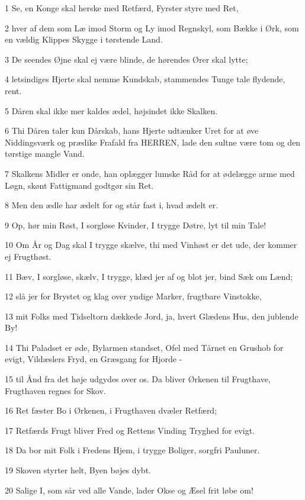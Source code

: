 \par 1 Se, en Konge skal herske med Retfærd, Fyrster styre med Ret,
\par 2 hver af dem som Læ imod Storm og Ly imod Regnskyl, som Bække i Ørk, som en vældig Klippes Skygge i tørstende Land.
\par 3 De seendes Øjne skal ej være blinde, de hørendes Ører skal lytte;
\par 4 letsindiges Hjerte skal nemme Kundskab, stammendes Tunge tale flydende, rent.
\par 5 Dåren skal ikke mer kaldes ædel, højsindet ikke Skalken.
\par 6 Thi Dåren taler kun Dårskab, hans Hjerte udtænker Uret for at øve Niddingsværk og prædike Frafald fra HERREN, lade den sultne være tom og den tørstige mangle Vand.
\par 7 Skalkens Midler er onde, han oplægger lumske Råd for at ødelægge arme med Løgn, skønt Fattigmand godtgør sin Ret.
\par 8 Men den ædle har ædelt for og står fast i, hvad ædelt er.
\par 9 Op, hør min Røst, I sorgløse Kvinder, I trygge Døtre, lyt til min Tale!
\par 10 Om År og Dag skal I trygge skælve, thi med Vinhøst er det ude, der kommer ej Frugthøst.
\par 11 Bæv, I sorgløse, skælv, I trygge, klæd jer af og blot jer, bind Sæk om Lænd;
\par 12 slå jer for Brystet og klag over yndige Marker, frugtbare Vinstokke,
\par 13 mit Folks med Tidseltorn dækkede Jord, ja, hvert Glædens Hus, den jublende By!
\par 14 Thi Paladset er øde, Bylarmen standset, Ofel med Tårnet en Grushob for evigt, Vildæslers Fryd, en Græsgang for Hjorde -
\par 15 til Ånd fra det høje udgydes over os. Da bliver Ørkenen til Frugthave, Frugthaven regnes for Skov.
\par 16 Ret fæster Bo i Ørkenen, i Frugthaven dvæler Retfærd;
\par 17 Retfærds Frugt bliver Fred og Rettens Vinding Tryghed for evigt.
\par 18 Da bor mit Folk i Fredens Hjem, i trygge Boliger, sorgfri Pauluner.
\par 19 Skoven styrter helt, Byen bøjes dybt.
\par 20 Salige I, som sår ved alle Vande, lader Okse og Æsel frit løbe om!

